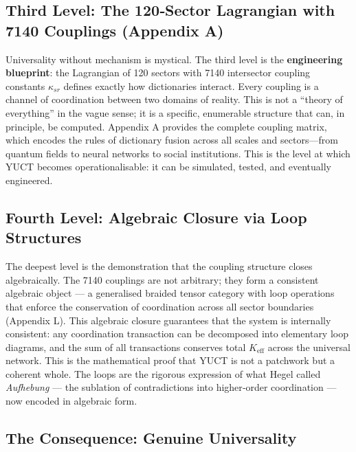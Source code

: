 \documentclass[12pt,a4paper]{article}
\begin{document}
	\subsection{Third Level: The 120‑Sector Lagrangian with 7140 Couplings (Appendix A)}
	
	Universality without mechanism is mystical. The third level is the \textbf{engineering blueprint}: the Lagrangian of 120 sectors with 7140 intersector coupling constants \(\kappa_{sr}\) defines exactly how dictionaries interact. Every coupling is a channel of coordination between two domains of reality. This is not a “theory of everything” in the vague sense; it is a specific, enumerable structure that can, in principle, be computed. Appendix A provides the complete coupling matrix, which encodes the rules of dictionary fusion across all scales and sectors—from quantum fields to neural networks to social institutions. This is the level at which YUCT becomes operationalisable: it can be simulated, tested, and eventually engineered.
	
	\subsection{Fourth Level: Algebraic Closure via Loop Structures}
	
	The deepest level is the demonstration that the coupling structure closes algebraically. The 7140 couplings are not arbitrary; they form a consistent algebraic object — a generalised braided tensor category with loop operations that enforce the conservation of coordination across all sector boundaries (Appendix L). This algebraic closure guarantees that the system is internally consistent: any coordination transaction can be decomposed into elementary loop diagrams, and the sum of all transactions conserves total \(K_{\mathrm{eff}}\) across the universal network. This is the mathematical proof that YUCT is not a patchwork but a coherent whole. The loops are the rigorous expression of what Hegel called \emph{Aufhebung} — the sublation of contradictions into higher‑order coordination — now encoded in algebraic form.
	
	\subsection{The Consequence: Genuine Universality}
	
\end{document}

